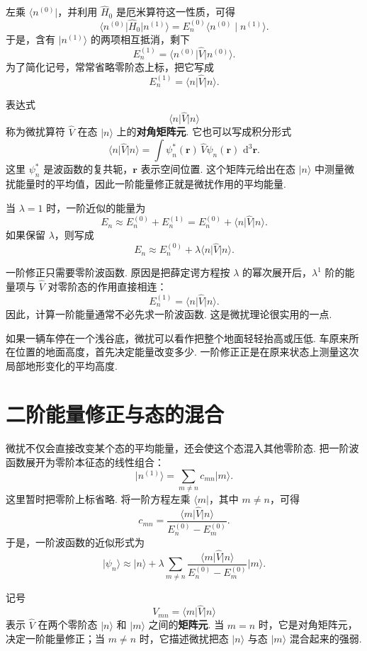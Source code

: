 \documentclass[UTF8,11pt,a4paper,openany]{ctexbook}
\newcommand{\ket}[1]{\lvert #1\rangle}\newcommand{\bra}[1]{\langle #1\rvert}
\newcommand{\braket}[2]{\langle #1\mid #2\rangle}\newcommand{\ii}{\mathrm i}
\newcommand{\dd}{\,\mathrm d}\newcommand{\Ham}{\hat H}\newcommand{\tr}{\operatorname{Tr}}
\newcommand{\term}[1]{\textbf{#1}}
\begin{document}
左乘 $\bra{n^{(0)}}$，并利用 $\hat H_0$ 是厄米算符这一性质，可得
\[
\bra{n^{(0)}}\hat H_0\ket{n^{(1)}}
=
E_n^{(0)}\braket{n^{(0)}}{n^{(1)}}.
\]
于是，含有 $\ket{n^{(1)}}$ 的两项相互抵消，剩下
\[
E_n^{(1)}
=
\bra{n^{(0)}}\hat V\ket{n^{(0)}}.
\]
为了简化记号，常常省略零阶态上标，把它写成
\[
E_n^{(1)}=\bra n\hat V\ket n.
\]

\begin{notationbox}
表达式
\[
\bra n\hat V\ket n
\]
称为微扰算符 $\hat V$ 在态 $\ket n$ 上的\term{对角矩阵元}. 它也可以写成积分形式
\[
\bra n\hat V\ket n
=
\int \psi_n^*(\boldsymbol r)\,
\hat V\psi_n(\boldsymbol r)\,
\dd^3\boldsymbol r.
\]
这里 $\psi_n^*$ 是波函数的复共轭，$\boldsymbol r$ 表示空间位置. 这个矩阵元给出在态 $\ket n$ 中测量微扰能量时的平均值，因此一阶能量修正就是微扰作用的平均能量. 
\end{notationbox}

当 $\lambda=1$ 时，一阶近似的能量为
\[
E_n\approx E_n^{(0)}+E_n^{(1)}
=
E_n^{(0)}+\bra n\hat V\ket n.
\]
如果保留 $\lambda$，则写成
\[
E_n\approx E_n^{(0)}+\lambda\bra n\hat V\ket n.
\]

\begin{derivationbox}
一阶修正只需要零阶波函数. 原因是把薛定谔方程按 $\lambda$ 的幂次展开后，$\lambda^1$ 阶的能量项与 $\hat V$ 对零阶态的作用直接相连：
\[
E_n^{(1)}=\bra n\hat V\ket n.
\]
因此，计算一阶能量通常不必先求一阶波函数. 这是微扰理论很实用的一点. 
\end{derivationbox}

\begin{analogybox}
如果一辆车停在一个浅谷底，微扰可以看作把整个地面轻轻抬高或压低. 车原来所在位置的地面高度，首先决定能量改变多少. 一阶修正正是在原来状态上测量这次局部地形变化的平均高度. 
\end{analogybox}

\section{二阶能量修正与态的混合}

微扰不仅会直接改变某个态的平均能量，还会使这个态混入其他零阶态. 把一阶波函数展开为零阶本征态的线性组合：
\[
\ket{n^{(1)}}=\sum_{m\ne n}c_{mn}\ket m.
\]
这里暂时把零阶上标省略. 将一阶方程左乘 $\bra m$，其中 $m\ne n$，可得
\[
c_{mn}
=
\frac{\bra m\hat V\ket n}
{E_n^{(0)}-E_m^{(0)}}.
\]
于是，一阶波函数的近似形式为
\[
\ket{\psi_n}
\approx
\ket n+
\lambda\sum_{m\ne n}
\frac{\bra m\hat V\ket n}
{E_n^{(0)}-E_m^{(0)}}\ket m.
\]

\begin{notationbox}
记号
\[
V_{mn}=\bra m\hat V\ket n
\]
表示 $\hat V$ 在两个零阶态 $\ket n$ 和 $\ket m$ 之间的\term{矩阵元}. 当 $m=n$ 时，它是对角矩阵元，决定一阶能量修正；当 $m\ne n$ 时，它描述微扰把态 $\ket n$ 与态 $\ket m$ 混合起来的强弱. 
\end{notationbox}
\end{document}
